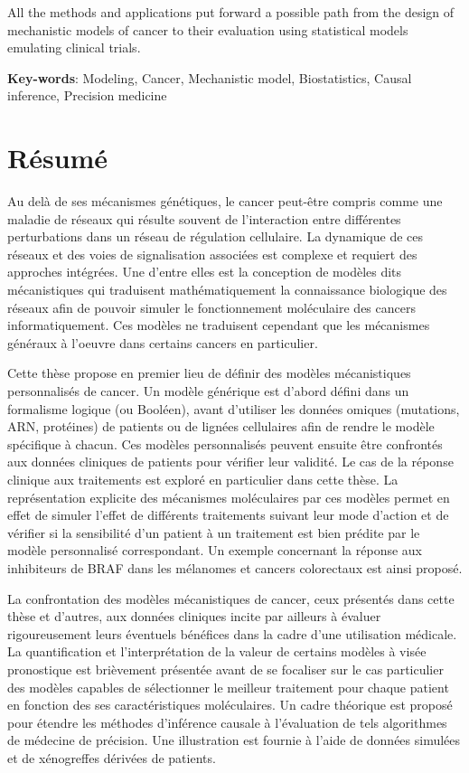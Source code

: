 \documentclass[a4paper,12pt,twoside,onecolumn,openright,final,oldfontcommands]{memoir}
\newcommand{\initial}[1]{
	\lettrine[lines=3,lhang=0.33,nindent=0em]{
		\color{gray}
     		{\textsc{#1}}}{}}
\begin{document}
All the methods and applications put forward a possible path from the
design of mechanistic models of cancer to their evaluation using
statistical models emulating clinical trials.

\vspace{\baselineskip}

\textbf{Key-words}: Modeling, Cancer, Mechanistic model, Biostatistics,
Causal inference, Precision medicine

\chapter*{Résumé}

\initial{A}u delà de ses mécanismes génétiques, le cancer peut-être
compris comme une maladie de réseaux qui résulte souvent de
l'interaction entre différentes perturbations dans un réseau de
régulation cellulaire. La dynamique de ces réseaux et des voies de
signalisation associées est complexe et requiert des approches
intégrées. Une d'entre elles est la conception de modèles dits
mécanistiques qui traduisent mathématiquement la connaissance biologique
des réseaux afin de pouvoir simuler le fonctionnement moléculaire des
cancers informatiquement. Ces modèles ne traduisent cependant que les
mécanismes généraux à l'oeuvre dans certains cancers en particulier.

Cette thèse propose en premier lieu de définir des modèles mécanistiques
personnalisés de cancer. Un modèle générique est d'abord défini dans un
formalisme logique (ou Booléen), avant d'utiliser les données omiques
(mutations, ARN, protéines) de patients ou de lignées cellulaires afin
de rendre le modèle spécifique à chacun. Ces modèles personnalisés
peuvent ensuite être confrontés aux données cliniques de patients pour
vérifier leur validité. Le cas de la réponse clinique aux traitements
est exploré en particulier dans cette thèse. La représentation explicite
des mécanismes moléculaires par ces modèles permet en effet de simuler
l'effet de différents traitements suivant leur mode d'action et de
vérifier si la sensibilité d'un patient à un traitement est bien prédite
par le modèle personnalisé correspondant. Un exemple concernant la
réponse aux inhibiteurs de BRAF dans les mélanomes et cancers
colorectaux est ainsi proposé.

La confrontation des modèles mécanistiques de cancer, ceux présentés
dans cette thèse et d'autres, aux données cliniques incite par ailleurs
à évaluer rigoureusement leurs éventuels bénéfices dans la cadre d'une
utilisation médicale. La quantification et l'interprétation de la valeur
de certains modèles à visée pronostique est brièvement présentée avant
de se focaliser sur le cas particulier des modèles capables de
sélectionner le meilleur traitement pour chaque patient en fonction des
ses caractéristiques moléculaires. Un cadre théorique est proposé pour
étendre les méthodes d'inférence causale à l'évaluation de tels
algorithmes de médecine de précision. Une illustration est fournie à
l'aide de données simulées et de xénogreffes dérivées de patients.
\end{document}
